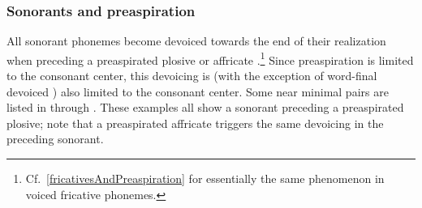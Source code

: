 \subsubsection{Sonorants and preaspiration}\label{sonorantsAndPreaspiration}
All sonorant phonemes become devoiced towards the end of their realization when preceding a preaspirated plosive or affricate%
.\footnote{Cf.~\SEC\ref{fricativesAndPreaspiration} for essentially the same phenomenon in voiced fricative phonemes.} 
Since preaspiration is limited to the consonant center, this devoicing is (with the exception of word-final devoiced ) also limited to the consonant center. Some near minimal pairs are listed in  through . 
These examples all show a sonorant preceding a preaspirated plosive; note that a preaspirated affricate triggers the same devoicing in the preceding sonorant. 



